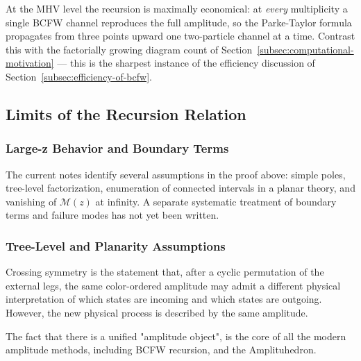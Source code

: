 \begin{remark}
	At the MHV level the recursion is maximally economical: at \emph{every} multiplicity a single BCFW channel reproduces the full amplitude, so the Parke-Taylor formula propagates from three points upward one two-particle channel at a time. Contrast this with the factorially growing diagram count of Section~\ref{subsec:computational-motivation} --- this is the sharpest instance of the efficiency discussion of Section~\ref{subsec:efficiency-of-bcfw}.
\end{remark}

\subsection{Limits of the Recursion Relation}
\label{subsec:limits-of-the-recursion-relation}

\subsubsection{Large-z Behavior and Boundary Terms}
\label{subsubsec:large-z-behavior-and-boundary-terms}

The current notes identify several assumptions in the proof above: simple poles, tree-level factorization, enumeration of connected intervals in a planar theory, and vanishing of $\mathcal{M}(z)$ at infinity. A separate systematic treatment of boundary terms and failure modes has not yet been written.

\subsubsection{Tree-Level and Planarity Assumptions}
\label{subsubsec:tree-level-and-planarity-assumptions}

Crossing symmetry is the statement that, after a cyclic permutation of the external legs, the same color-ordered amplitude may admit a different physical interpretation of which states are incoming and which states are outgoing. However, the new physical process is described by the same amplitude.

The fact that there is a unified "amplitude object", is the core of all the modern amplitude methods, including BCFW recursion, and the Amplituhedron.
